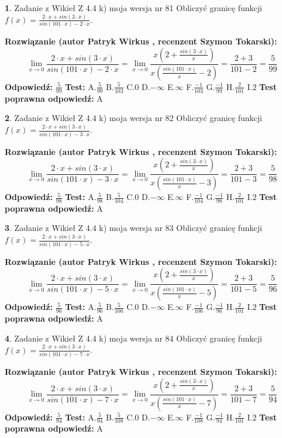 \documentclass[12pt, a4paper]{article}
\theoremstyle{definition} %
\newtheorem{zad}{}
\newcommand{\zadStart}[1]{\begin{zad}#1\newline}
\newcommand{\zadStop}{\end{zad}}
\newcommand{\rozwStart}[2]{\noindent \textbf{Rozwiązanie (autor #1 , recenzent #2): }\newline}
\newcommand{\rozwStop}{\newline}
\newcommand{\odpStart}{\noindent \textbf{Odpowiedź:}\newline}
\newcommand{\odpStop}{\newline}
\newcommand{\testStart}{\noindent \textbf{Test:}\newline}
\newcommand{\testStop}{\newline}
\newcommand{\kluczStart}{\noindent \textbf{Test poprawna odpowiedź:}\newline}
\newcommand{\kluczStop}{\newline}
\begin{document}
\zadStart{Zadanie z Wikieł Z 4.4 k) moja wersja nr 81}
Obliczyć granicę funkcji $f(x)=\frac{2\cdot x +sin(3\cdot x)}{sin(101\cdot x) -2\cdot x}$.
\zadStop
\rozwStart{Patryk Wirkus}{Szymon Tokarski}
$$\lim\limits_{x\to 0}\frac{2\cdot x +sin(3\cdot x)}{sin(101\cdot x) -2\cdot x}
=\lim\limits_{x\to 0}\frac{x(2+\frac{sin(3\cdot x)}{x})}{x(\frac{sin(101\cdot x)}{x}-2)}
=\frac{2+3}{101-2} = \frac{5}{99}$$
\rozwStop
\odpStart
$\frac{5}{99}$
\odpStop
\testStart
A.$\frac{5}{99}$
B.$\frac{5}{103}$
C.$0$
D.$-\infty$
E.$\infty$
F.$\frac{-1}{103}$
G.$\frac{-1}{99}$
H.$\frac{2}{101}$
I.$2$
\testStop
\kluczStart
A
\kluczStop



\zadStart{Zadanie z Wikieł Z 4.4 k) moja wersja nr 82}
Obliczyć granicę funkcji $f(x)=\frac{2\cdot x +sin(3\cdot x)}{sin(101\cdot x) -3\cdot x}$.
\zadStop
\rozwStart{Patryk Wirkus}{Szymon Tokarski}
$$\lim\limits_{x\to 0}\frac{2\cdot x +sin(3\cdot x)}{sin(101\cdot x) -3\cdot x}
=\lim\limits_{x\to 0}\frac{x(2+\frac{sin(3\cdot x)}{x})}{x(\frac{sin(101\cdot x)}{x}-3)}
=\frac{2+3}{101-3} = \frac{5}{98}$$
\rozwStop
\odpStart
$\frac{5}{98}$
\odpStop
\testStart
A.$\frac{5}{98}$
B.$\frac{5}{104}$
C.$0$
D.$-\infty$
E.$\infty$
F.$\frac{-1}{104}$
G.$\frac{-1}{98}$
H.$\frac{2}{101}$
I.$2$
\testStop
\kluczStart
A
\kluczStop



\zadStart{Zadanie z Wikieł Z 4.4 k) moja wersja nr 83}
Obliczyć granicę funkcji $f(x)=\frac{2\cdot x +sin(3\cdot x)}{sin(101\cdot x) -5\cdot x}$.
\zadStop
\rozwStart{Patryk Wirkus}{Szymon Tokarski}
$$\lim\limits_{x\to 0}\frac{2\cdot x +sin(3\cdot x)}{sin(101\cdot x) -5\cdot x}
=\lim\limits_{x\to 0}\frac{x(2+\frac{sin(3\cdot x)}{x})}{x(\frac{sin(101\cdot x)}{x}-5)}
=\frac{2+3}{101-5} = \frac{5}{96}$$
\rozwStop
\odpStart
$\frac{5}{96}$
\odpStop
\testStart
A.$\frac{5}{96}$
B.$\frac{5}{106}$
C.$0$
D.$-\infty$
E.$\infty$
F.$\frac{-1}{106}$
G.$\frac{-1}{96}$
H.$\frac{2}{101}$
I.$2$
\testStop
\kluczStart
A
\kluczStop



\zadStart{Zadanie z Wikieł Z 4.4 k) moja wersja nr 84}
Obliczyć granicę funkcji $f(x)=\frac{2\cdot x +sin(3\cdot x)}{sin(101\cdot x) -7\cdot x}$.
\zadStop
\rozwStart{Patryk Wirkus}{Szymon Tokarski}
$$\lim\limits_{x\to 0}\frac{2\cdot x +sin(3\cdot x)}{sin(101\cdot x) -7\cdot x}
=\lim\limits_{x\to 0}\frac{x(2+\frac{sin(3\cdot x)}{x})}{x(\frac{sin(101\cdot x)}{x}-7)}
=\frac{2+3}{101-7} = \frac{5}{94}$$
\rozwStop
\odpStart
$\frac{5}{94}$
\odpStop
\testStart
A.$\frac{5}{94}$
B.$\frac{5}{108}$
C.$0$
D.$-\infty$
E.$\infty$
F.$\frac{-1}{108}$
G.$\frac{-1}{94}$
H.$\frac{2}{101}$
I.$2$
\testStop
\kluczStart
A
\kluczStop
\end{document}

